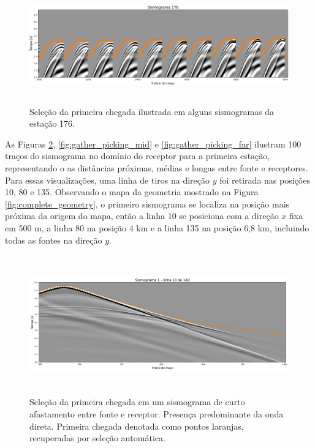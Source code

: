 \begin{figure}[H]
	\centering
	\includegraphics[width=16cm,height=5cm]{Imgs/Metodologia/gather_example.png}
	\caption{Seleção da primeira chegada ilustrada em alguns sismogramas da estação 176.}
	\label{fig:gather_example}	
\end{figure}

As Figuras \ref{fig:gather_picking_near}, \ref{fig:gather_picking_mid} e \ref{fig:gather_picking_far} ilustram 100 traços do sismograma no domínio do receptor para a primeira estação, representando o as distâncias próximas, médias e longas entre fonte e receptores. Para essas visualizações, uma linha de tiros na direção $y$ foi retirada nas posições 10, 80 e 135. Observando o mapa da geometria mostrado na Figura \ref{fig:complete_geometry}, o primeiro sismograma se localiza na posição mais próxima da origem do mapa, então a linha 10 se posiciona com a direção $x$ fixa em 500 m, a linha 80 na posição 4 km e a linha 135 na posição 6,8 km, incluindo todas as fontes na direção $y$. 

\begin{figure}[H]
	\centering
	\includegraphics[width=16cm,height=6cm]{Imgs/Metodologia/linha10_sismo1.png}
	\caption{Seleção da primeira chegada em um sismograma de curto afastamento entre fonte e receptor. Presença predominante da onda direta. Primeira chegada denotada como pontos laranjas, recuperadas por seleção automática.}
	\label{fig:gather_picking_near}	
\end{figure}

